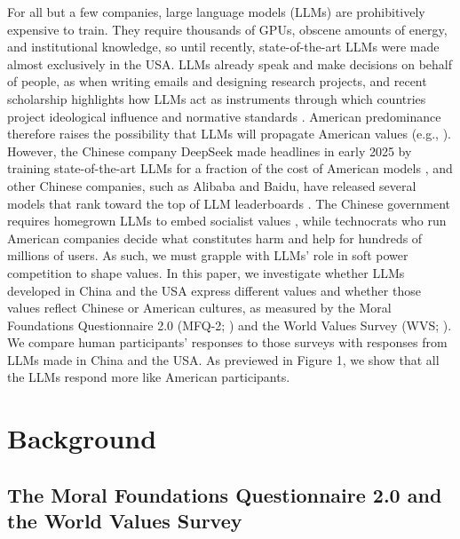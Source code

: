 \documentclass[11pt,a4paper]{article}
\begin{document}
For all but a few companies, large language models (LLMs) are prohibitively expensive to train. They require thousands of GPUs, obscene amounts of energy, and institutional knowledge, so until recently, state-of-the-art LLMs were made almost exclusively in the USA. LLMs already speak and make decisions on behalf of people, as when writing emails and designing research projects, and recent scholarship highlights how LLMs act as instruments through which countries project ideological influence and normative standards \cite{dunnmon2025, drexel2025}. American predominance therefore raises the possibility that LLMs will propagate American values (e.g., \citealp{atari2023humans}). However, the Chinese company DeepSeek made headlines in early 2025 by training state-of-the-art LLMs for a fraction of the cost of American models \cite{guo2025deepseek}, and other Chinese companies, such as Alibaba and Baidu, have released several models that rank toward the top of LLM leaderboards \cite{yang2025qwen3, ernie4.5}. The Chinese government requires homegrown LLMs to embed socialist values \cite{govcn2023}, while technocrats who run American companies decide what constitutes harm and help for hundreds of millions of users. As such, we must grapple with LLMs’ role in soft power competition to shape values. In this paper, we investigate whether LLMs developed in China and the USA express different values and whether those values reflect Chinese or American cultures, as measured by the Moral Foundations Questionnaire 2.0 (MFQ-2; \citealp{atari2023morality}) and the World Values Survey (WVS; \citealp{haerpfer2022world}). We compare human participants’ responses to those surveys with responses from LLMs made in China and the USA. As previewed in Figure 1, we show that all the LLMs respond more like American participants. 

\section{Background}

\subsection{The Moral Foundations Questionnaire 2.0 and the World Values Survey}
\end{document}
